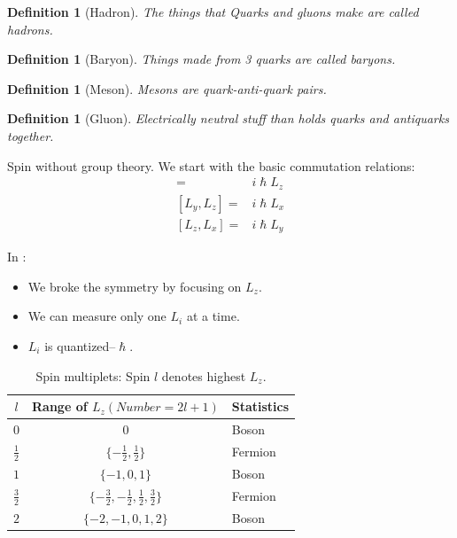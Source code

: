 \documentclass[]{article}
\newtheorem{defn}[thm]{Definition}
\begin{document}
\begin{defn}[Hadron]
	The things that Quarks and gluons make are called hadrons.
\end{defn}

\begin{defn}[Baryon]
	Things made from 3 quarks are called baryons.
\end{defn}

\begin{defn}[Meson]
	Mesons are quark-anti-quark pairs.
\end{defn}

\begin{defn}[Gluon]
	Electrically neutral stuff than holds quarks and antiquarks together.
\end{defn}

Spin without group theory. We start with the basic commutation relations:\cite{susskind2009particles}
\begin{align*}
	[L_x,L_y] =& i \hslash L_z\\
	[L_y,L_z] =& i \hslash L_x\\
	[L_z,L_x] =& i \hslash L_y
\end{align*}

In \cite{susskind2009particles}:

\begin{itemize}
	\item We broke the symmetry by focusing on $L_z$.
	\item We can measure only one $L_i$ at a time.
	\item $L_i$ is quantized--$\hslash$.
\end{itemize}

\begin{table}[H]
	\begin{center}
		\caption{Spin multiplets: Spin $l$ denotes highest $L_z$.}
		\begin{tabular}{|c|c|l|} \hline
		$l$&Range of $L_z (Number=2l+1)$&Statistics\\ \hline
		$0$&$0$& Boson\\ \hline
		$\frac{1}{2}$&$\{-\frac{1}{2},\frac{1}{2}\}$& Fermion\\ \hline
		$1$&$\{-1,0,1\}$&Boson \\ \hline
		$\frac{3}{2}$&$\{-\frac{3}{2},-\frac{1}{2},\frac{1}{2},\frac{3}{2}\}$&Fermion \\ \hline
		$2$&$\{-2,-1,0,1,2\}$&Boson \\ \hline
		\end{tabular}
	\end{center}
\end{table}
\end{document}
